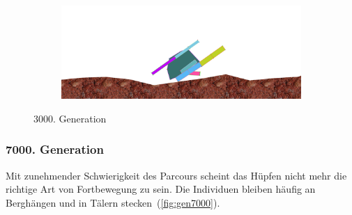\begin{figure}[H]
\begin{subfigure}[b]{0.45\textwidth}
            \includegraphics[width=\linewidth,center]{graphics/simulation-results/4_gen3000_4}
            \caption{\label{fig:gen3000_4}}
          \end{subfigure}
          \caption{3000. Generation\label{fig:gen3000}}
        \end{figure}

      \subsubsection{7000. Generation}

        Mit zunehmender Schwierigkeit des Parcours scheint das Hüpfen nicht mehr die richtige Art von Fortbewegung zu sein.
        Die Individuen bleiben häufig an Berghängen und in Tälern stecken~(\vref{fig:gen7000}).

        \vspace{0.5cm}

